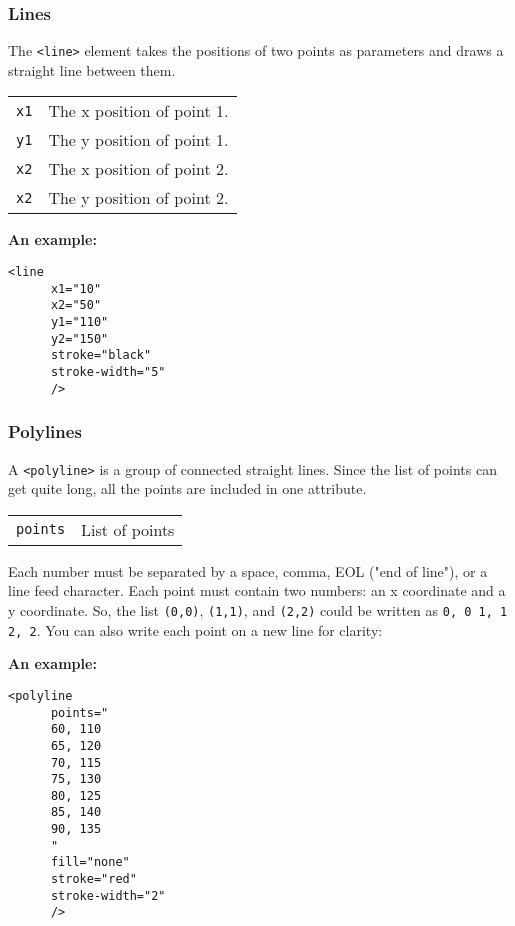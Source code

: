 \documentclass[11pt,a4paper]{report}
\begin{document}
\newpage
\subsubsection{Lines}
The \verb|<line>| element takes the positions of two points as parameters and draws a straight line between them.
\begin{center}
\begin{tabular}{l|p{15cm}}
\verb|x1| & The x position of  point 1. \\
\verb|y1| & The y position of  point 1. \\
\verb|x2| & The x position of  point 2. \\
\verb|x2| & The y position of  point 2. 
\end{tabular}
\end{center}

{\bf An example:}
\begin{multicols}{2}
\begin{lstlisting}
<line 
      x1="10" 
      x2="50" 
      y1="110" 
      y2="150" 
      stroke="black" 
      stroke-width="5"
      />
\end{lstlisting}
\columnbreak

\end{multicols}

\newpage
\subsubsection{Polylines}
A \verb|<polyline>| is a group of connected straight lines. Since the list of points can get quite long, all the points are included in one attribute.
\begin{center}
\begin{tabular}{l|p{15cm}}
\verb|points| & List of points
\end{tabular}
\end{center}

Each number must be separated by a space, comma, EOL ("end of line"), or a line feed character. Each point must contain two numbers: an x coordinate and a y coordinate. So, the list \verb|(0,0)|, \verb|(1,1)|, and \verb|(2,2)| could be written as \verb|0, 0 1, 1 2, 2|. You can also write each point on a new line for clarity:

{\bf An example:}
\begin{multicols}{2}
\begin{lstlisting}
<polyline 
      points="
      60, 110 
      65, 120 
      70, 115 
      75, 130 
      80, 125 
      85, 140 
      90, 135 
      "
      fill="none"
      stroke="red"
      stroke-width="2"
      />
\end{lstlisting}
\columnbreak

\end{multicols}
\end{document}
